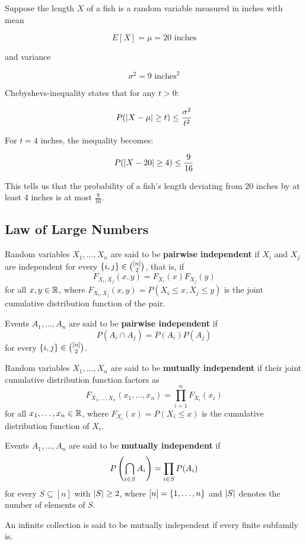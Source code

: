 \documentclass{article}
\begin{document}
\begin{example}\label{chebyshev-fish}
Suppose the length $X$ of a fish is a \@{random variable} measured in inches with mean

\[ E[X] = \mu = 20 \text{ inches} \]

and \@{variance}

\[ \sigma^2 = 9 \text{ inches}^2 \]

\@{Chebyshevs-inequality} states that for any $t > 0$:

\[ P(\left| X - \mu \right| \ge t) \le \frac{\sigma^2}{t^2} \]

For $t = 4$ inches, the inequality becomes:

\[ P(\left| X - 20 \right| \ge 4) \le \frac{9}{16} \]

This tells us that the \@{probability} of a fish's length deviating from 20 inches by at least 4 inches is at most $\frac{9}{16}$.
\end{example}

\subsection{Law of Large Numbers}

\begin{definition}
        \@{Random variables} $X_1, \dots, X_n$ are said to be \textbf{pairwise independent} if $X_i$ and $X_j$ are \@{independent} for every $\left\{ i,j \right\} \in \binom{[n]}{2}$, that is, if
        \[ F_{X_i, X_j}(x, y) = F_{X_i}(x) F_{X_j}(y) \]
        for all $x, y \in \mathbb{R}$, where $F_{X_i, X_j}(x,y) = P(X_i \leq x, X_j \leq y)$ is the joint \@{cumulative distribution function} of the pair.

        \@{Events} $A_1, \dots, A_n$ are said to be \textbf{pairwise independent} if
        \[ P(A_i \cap A_j) = P(A_i) P(A_j) \]
        for every $\left\{ i,j \right\} \in \binom{[n]}{2}$.
\end{definition}

\begin{definition}
        \@{Random variables} $X_1, \dots, X_n$ are said to be \textbf{mutually independent} if their joint \@{cumulative distribution function} factors as
        \[ F_{X_1, \dots, X_n}(x_1, \dots, x_n) = \prod_{i=1}^{n} F_{X_i}(x_i) \]
        for all $x_1, \dots, x_n \in \mathbb{R}$, where $F_{X_i}(x) = P(X_i \leq x)$ is the cumulative distribution function of $X_i$.

        \@{Events} $A_1, \dots, A_n$ are said to be \textbf{mutually independent} if
        \[ P\left(\bigcap_{i \in S} A_i\right) = \prod_{i \in S} P(A_i) \]
        for every $S \subseteq [n]$ with $\left| S \right| \geq 2$, where $[n] = \left\{ 1, \dots, n \right\}$ and $\left| S \right|$ denotes the number of \@{elements} of $S$.

        An infinite collection is said to be mutually independent if every finite subfamily is.
\end{definition}
\end{document}
